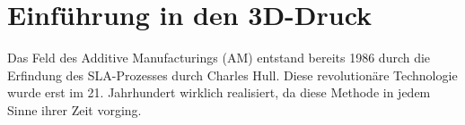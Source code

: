 \documentclass[main.tex]{subfiles}
\begin{document}
\section{Einführung in den 3D-Druck}
Das Feld des Additive Manufacturings (AM) entstand bereits 1986 durch die Erfindung des SLA-Prozesses durch Charles Hull. \parencite{BHATIA20231060} 
Diese revolutionäre Technologie wurde erst im 21. Jahrhundert wirklich realisiert, da diese Methode in jedem Sinne ihrer Zeit vorging.
\end{document}
